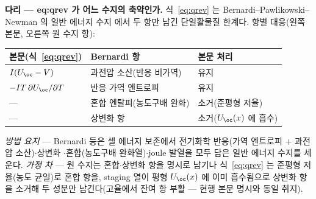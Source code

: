 
\begin{srcbox}
\textbf{다리 --- eq:qrev 가 어느 수지의 축약인가.} 식~\eqref{eq:qrev} 는 Bernardi--Pawlikowski--Newman 의
일반 에너지 수지\cite{bernardi1985} 에서 두 항만 남긴 단일활물질 한계다. 항별 대응(왼쪽 본문, 오른쪽 원
수지 항):
\begin{center}\footnotesize
\begin{tabular}{@{}lll@{}}
\hline
본문(식~\eqref{eq:qrev}) & Bernardi\cite{bernardi1985} 항 & 본문 처리 \\
\hline
$I(U_\oc-V)$ & 과전압 소산(반응 비가역) & 유지 \\
$-IT\,\partial U_\oc/\partial T$ & 반응 가역 엔트로피 & 유지 \\
--- & 혼합 엔탈피(농도구배 완화) & 소거(준평형 저율) \\
--- & 상변화 항 & 소거($U_\oc(x)$ 에 흡수) \\
\hline
\end{tabular}
\end{center}
\emph{방법 요지} --- Bernardi 등은 셀 에너지 보존에서 전기화학 반응(가역 엔트로피 $+$ 과전압 소산)$\cdot$상변화
$\cdot$혼합(농도구배 완화열)$\cdot$joule 발열을 모두 담은 일반 에너지 수지를 세운다. \emph{가정 차} --- 원 수지는
혼합$\cdot$상변화 항을 명시로 남기나 식~\eqref{eq:qrev} 는 준평형 저율(농도 균일)로 혼합 항을, staging 열이
평형 $U_\oc(x)$ 에 이미 흡수됨으로 상변화 항을 소거해 두 성분만 남긴다(고율에서 잔여 항 부활 --- 현행 본문
명시와 동일 취지).
\end{srcbox}
